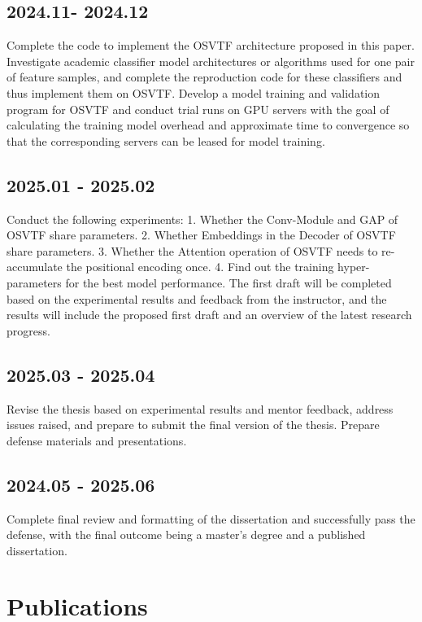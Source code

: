 \documentclass{article}
\begin{document}
\subsection*{2024.11- 2024.12}

Complete the code to implement the OSVTF architecture proposed in this paper. Investigate academic classifier model architectures or algorithms used for one pair of feature samples, and complete the reproduction code for these classifiers and thus implement them on OSVTF. Develop a model training and validation program for OSVTF and conduct trial runs on GPU servers with the goal of calculating the training model overhead and approximate time to convergence so that the corresponding servers can be leased for model training.

\subsection*{2025.01 - 2025.02}

Conduct the following experiments: 1. Whether the Conv-Module and GAP of OSVTF share parameters. 2. Whether Embeddings in the Decoder of OSVTF share parameters. 3. Whether the Attention operation of OSVTF needs to re-accumulate the positional encoding once. 4. Find out the training hyper-parameters for the best model performance. The first draft will be completed based on the experimental results and feedback from the instructor, and the results will include the proposed first draft and an overview of the latest research progress.

\subsection*{2025.03 - 2025.04}

Revise the thesis based on experimental results and mentor feedback, address issues raised, and prepare to submit the final version of the thesis. Prepare defense materials and presentations.

\subsection*{2024.05 - 2025.06}

Complete final review and formatting of the dissertation and successfully pass the defense, with the final outcome being a master's degree and a published dissertation.

\section{Publications}
\end{document}
